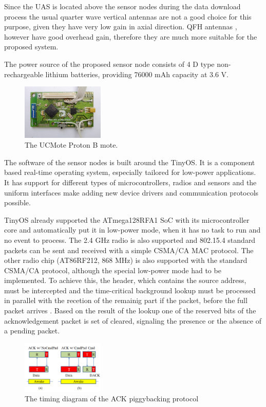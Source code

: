 \documentclass[conference]{IEEEtran}
\begin{document}
Since the UAS is located above the sensor nodes during the data download
process the usual quarter wave vertical antennas are not a good choice for
this purpose, given they have very low gain in axial direction. QFH antennas \cite{adams1974},
however have good overhead gain, therefore they are much more suitable for the
proposed system.

The power source of the proposed sensor node consists of 4 D type non-rechargeable
lithium batteries, providing 76000 mAh capacity at 3.6 V.

\begin{figure}[htbp]
	\centering
	\includegraphics[width=0.35\textwidth]{fig/ucproton.png}
  \caption{The UCMote Proton B mote.}
	\label{fig-proton}
\end{figure}

The software of the sensor nodes is built around the TinyOS. It is a component
based real-time operating system, especially tailored for low-power
applications. It has support for different types of microcontrollers, radios
and sensors and the uniform interfaces make adding new device drivers and
communication protocols possible.

TinyOS already supported the ATmega128RFA1 SoC with its microcontroller core
and automatically put it in low-power mode, when it has no task to run and no
event to process. The 2.4 GHz radio is also supported and 802.15.4 standard
packets can be sent and received with a simple CSMA/CA MAC protocol. The other
radio chip (AT86RF212, 868 MHz) is also supported with the standard CSMA/CA
protocol, although the special low-power mode had to be implemented. To achieve this,
the header, which contains the source address, must be intercepted and the
time-critical background lookup must be processed in parallel with the recetion
of the remainig part if the packet, before the full packet arrives \cite{vakulya2013}.
Based on
the result of the lookup one of the reserved bits of the acknowledgement packet
is set of cleared, signaling the presence or the absence of a pending packet.

\begin{figure}[htbp]
	\centering
	\includegraphics[width=0.35\textwidth]{fig/protocol.png}
  \caption{The timing diagram of the ACK piggybacking protocol}
	\label{fig-piggyback}
\end{figure}
\end{document}
